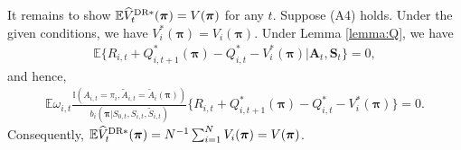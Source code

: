 \documentclass{article}
\newcommand{\Mean}{{\mathbb{E}}}
\begin{document}
It remains to show $\Mean \widehat{V}_t^{\hbox{\scriptsize{DR}}*}(\bm{\pi})=V(\bm{\pi})$ for any $t$. Suppose (A4) holds. Under the given conditions, we have $V_i^*(\bm{\pi})=V_i(\bm{\pi})$. Under Lemma \ref{lemma:Q}, we have
\begin{eqnarray*}
	\Mean \{R_{i,t}+Q_{i,t+1}^*(\bm{\pi})-Q_{i,t}^*-V_i^*(\bm{\pi})|\bm{A}_t,\bm{S}_t\}=0,
\end{eqnarray*}
and hence,
\begin{eqnarray*}
	\Mean \omega_{i,t}\frac{\mathbb{I}(A_{i,t}=\pi_i,\widetilde{A}_{i,t}=\widetilde{A}_i(\bm{\pi}))}{b_i(\bm{\pi}|S_{0,t},S_{i,t},\widetilde{S}_{i,t})}
	\{R_{i,t}+Q_{i,t+1}^*(\bm{\pi})-Q_{i,t}^*-V_i^*(\bm{\pi})\}=0.
\end{eqnarray*}
Consequently, $\Mean \widehat{V}_t^{\hbox{\scriptsize{DR}}*}(\bm{\pi})=N^{-1} \sum_{i=1}^N V_i(\bm{\pi})=V(\bm{\pi})$.
\end{document}
